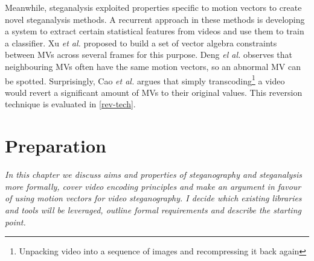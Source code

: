 \documentclass[12pt,british,twoside,notitlepage,usenames,dvipsnames,hypens,final]{report}
\numberwithin{equation}{section}
\numberwithin{figure}{section}
\begin{document}
Meanwhile, steganalysis exploited properties specific to motion vectors to create novel steganalysis methods. A recurrent approach in these methods is developing a system to extract certain statistical features from videos and use them to train a classifier. Xu \emph{et al.} \cite{xu2013video} proposed to build a set of vector algebra constraints between MVs across several frames for this purpose. Deng \emph{el al.} \cite{deng2012digital} observes that neighbouring MVs often have the same motion vectors, so an abnormal MV can be spotted. Surprisingly, Cao \emph{et al.} \cite{cao2012video} argues that simply transcoding\footnote{Unpacking video into a sequence of images and recompressing it back again} a video would revert a significant amount of MVs to their original values. This reversion technique is evaluated in \ref{rev-tech}.

 

\cleardoublepage
\chapter{Preparation}

\textit{In this chapter we discuss aims and properties of steganography and steganalysis more formally, cover video encoding principles and make an argument in favour of using motion vectors for video steganography. I decide which existing libraries and tools will be leveraged, outline formal requirements and describe the starting point. } 
\end{document}

